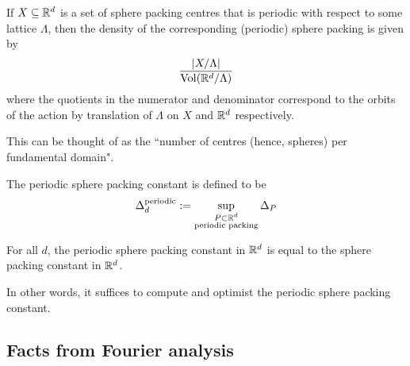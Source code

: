 \begin{lemma}\label{SpherePacking.Density of periodic packing}\notready
  If $X \subseteq \mathbb{R}^d$ is a set of sphere packing centres that is periodic with respect to some lattice $\Lambda$, then the density of the corresponding (periodic) sphere packing is given by
  $$ \frac{\lvert {X/\Lambda} \rvert}{\mathrm{Vol}(\mathbb{R}^d / \Lambda)} $$
  where the quotients in the numerator and denominator correspond to the orbits of the action by translation of $\Lambda$ on $X$ and $\mathbb{R}^d$ respectively.
\end{lemma}
\begin{remark}
  This can be thought of as the ``number of centres (hence, spheres) per fundamental domain".
\end{remark}

\begin{definition}\label{def-Periodic-sphere-packing-constant}\notready
    The periodic sphere packing constant is defined to be
    $$ \Delta_{d}^{\text{periodic}} := \sup_{\substack{P \subset \mathbb{R}^d \\ \text{periodic packing}}} \Delta_P$$
\end{definition}

\begin{theorem}\label{thm: Periodic constant equals constant}\notready
    For all $d$, the periodic sphere packing constant in $\mathbb{R}^d$ is equal to the sphere packing constant in $\mathbb{R}^d$.
\end{theorem}
In other words, it suffices to compute and optimist the periodic sphere packing constant.

\subsection{Facts from Fourier analysis}  %

